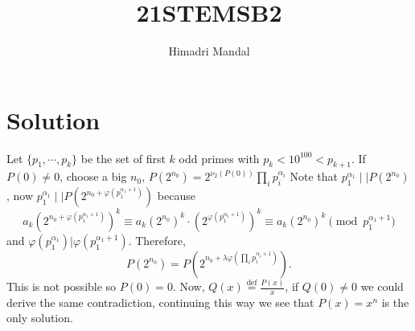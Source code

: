 \documentclass[11pt]{scrartcl}
\title{21STEMSB2}
\author{Himadri Mandal}
\begin{document}
\maketitle

\section{Solution}
\begin{soln}
  Let $\{p_1,\cdots,p_k\}$ be the set of first $k$ odd primes with $p_k < 10^{100} < p_{k+1}$. If $P(0) \neq 0$,
  choose a big $n_0$, $P(2^{n_0}) = 2^{\nu_2(P(0))}\prod_ip_i^{\alpha_i}$
  Note that $p_1^{\alpha_1} \mid\mid P(2^{n_0})$, now $p_1^{\alpha_1} \mid\mid P(2^{n_0 + \varphi(p_1^{\alpha_1+1})})$
  because \[ a_k(2^{n_0 + \varphi(p_1^{\alpha_1+1})})^k \equiv a_k(2^{n_0})^k \cdot (2^{\varphi(p_1^{\alpha_1+1})})^k \equiv a_k (2^{n_0})^k \pmod{p_1^{\alpha_1+1}} \]
  and $\varphi(p_1^{\alpha_1}) | \varphi(p_1^{\alpha_1 + 1})$. Therefore, 
  \[ P(2^{n_0}) = P(2^{n_0 + \lambda\varphi(\prod_ip_i^{\alpha_i + 1})}). \]
  This is not possible so $P(0) = 0$. Now, $Q(x) \overset{\text{def}}= \frac{P(x)}{x}$, if $Q(0) \neq 0$ we could derive the same contradiction,
  continuing this way we see that $P(x) = x^n$ is the only solution.
\end{soln}
\end{document}
